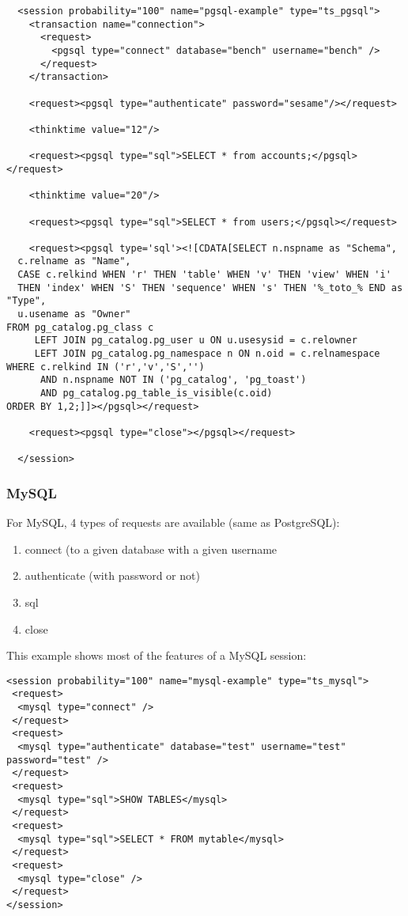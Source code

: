\documentclass{TSUNG-en}
\begin{document}
\begin{Verbatim}
  <session probability="100" name="pgsql-example" type="ts_pgsql">
    <transaction name="connection">
      <request>
        <pgsql type="connect" database="bench" username="bench" />
      </request>
    </transaction>

    <request><pgsql type="authenticate" password="sesame"/></request>

    <thinktime value="12"/>

    <request><pgsql type="sql">SELECT * from accounts;</pgsql></request>

    <thinktime value="20"/>

    <request><pgsql type="sql">SELECT * from users;</pgsql></request>

    <request><pgsql type='sql'><![CDATA[SELECT n.nspname as "Schema",
  c.relname as "Name",
  CASE c.relkind WHEN 'r' THEN 'table' WHEN 'v' THEN 'view' WHEN 'i'
  THEN 'index' WHEN 'S' THEN 'sequence' WHEN 's' THEN '%_toto_% END as "Type",
  u.usename as "Owner"
FROM pg_catalog.pg_class c
     LEFT JOIN pg_catalog.pg_user u ON u.usesysid = c.relowner
     LEFT JOIN pg_catalog.pg_namespace n ON n.oid = c.relnamespace
WHERE c.relkind IN ('r','v','S','')
      AND n.nspname NOT IN ('pg_catalog', 'pg_toast')
      AND pg_catalog.pg_table_is_visible(c.oid)
ORDER BY 1,2;]]></pgsql></request>

    <request><pgsql type="close"></pgsql></request>

  </session>
\end{Verbatim}

\subsubsection{MySQL}
\label{sec:session:mysql}
For MySQL, 4 types of requests are available (same as PostgreSQL):
\begin{enumerate}
\item connect (to a given database with a given username
\item authenticate (with password or not)
\item sql
\item close
\end{enumerate}

This example shows most of the features of a MySQL session:

\begin{Verbatim}
<session probability="100" name="mysql-example" type="ts_mysql">
 <request>
  <mysql type="connect" />
 </request>
 <request>
  <mysql type="authenticate" database="test" username="test" password="test" />
 </request>
 <request>
  <mysql type="sql">SHOW TABLES</mysql>
 </request>
 <request>
  <mysql type="sql">SELECT * FROM mytable</mysql>
 </request>
 <request>
  <mysql type="close" />
 </request>
</session>
\end{Verbatim}
\end{document}
